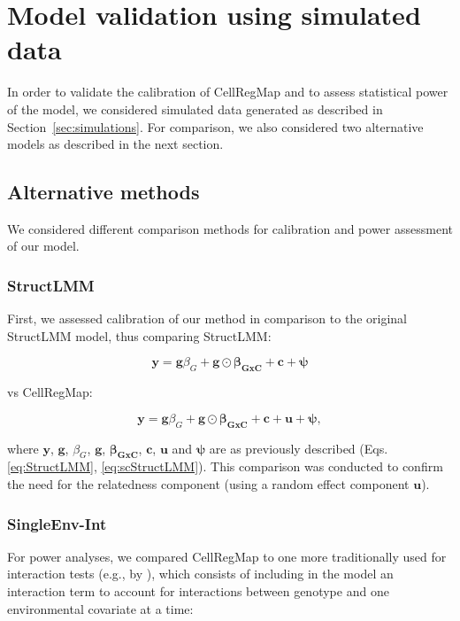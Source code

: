 
\section{Model validation using simulated data}
\label{sec:validation}

In order to validate the calibration of CellRegMap and to assess statistical power of the model, we considered simulated data generated as described in Section~\ref{sec:simulations}.
For comparison, we also considered two alternative models as described in the next section.

\subsection{Alternative methods}
We considered different comparison methods for calibration and power assessment of our model.

\subsubsection{StructLMM}

First, we assessed calibration of our method in comparison to the original StructLMM model, thus comparing StructLMM:

\begin{equation}
 \mathbf{y} = \mathbf{g}\beta_G + \mathbf{g} \odot \boldsymbol{\beta_{GxC}} + \mathbf{c} +\boldsymbol{\psi}
\end{equation}

vs CellRegMap:

\begin{equation}
 \mathbf{y} = \mathbf{g}\beta_G + \mathbf{g} \odot \boldsymbol{\beta_{GxC}} + \mathbf{c} + \mathbf{u} +\boldsymbol{\psi},
\end{equation}

where $\mathbf{y}$, $\mathbf{g}$, $\beta_G$, $\mathbf{g}$, $\boldsymbol{\beta_{GxC}}$, $\mathbf{c}$, $\mathbf{u}$ and $\boldsymbol{\psi}$ are as previously described (Eqs. \eqref{eq:StructLMM}, \eqref{eq:scStructLMM}). 
This comparison was conducted to confirm the need for the relatedness component (using a random effect component $\mathbf{u}$).

\subsubsection{SingleEnv-Int}

For power analyses, we compared CellRegMap  to one more traditionally used for interaction tests (e.g., by \cite{zhernakova2017identification, van2020single1}), which consists of including in the model an interaction term to account for interactions between genotype and one environmental covariate at a time:

